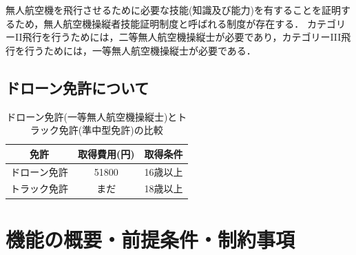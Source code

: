 \documentclass[a4paper, titlepage]{jsarticle}
\begin{document}
無人航空機を飛行させるために必要な技能(知識及び能力)を有することを証明するため，無人航空機操縦者技能証明制度と呼ばれる制度が存在する．
カテゴリーII飛行を行うためには，二等無人航空機操縦士が必要であり，カテゴリーIII飛行を行うためには，一等無人航空機操縦士が必要である\cite{delivery_guidelines_2023}．

\subsection{ドローン免許について}
\begin{table}[H]
  \centering
  \caption{ドローン免許(一等無人航空機操縦士)とトラック免許(準中型免許)の比較}
  \begin{tabular}{c c c} \hline
    免許 & 取得費用(円) & 取得条件 \\ \hline \hline
    ドローン免許 & 51800 & 16歳以上 \\
    トラック免許 & まだ &  18歳以上 \\ \hline
  \end{tabular}
  \label{tab:hikaku}
\end{table}



\section{機能の概要・前提条件・制約事項}
\end{document}
